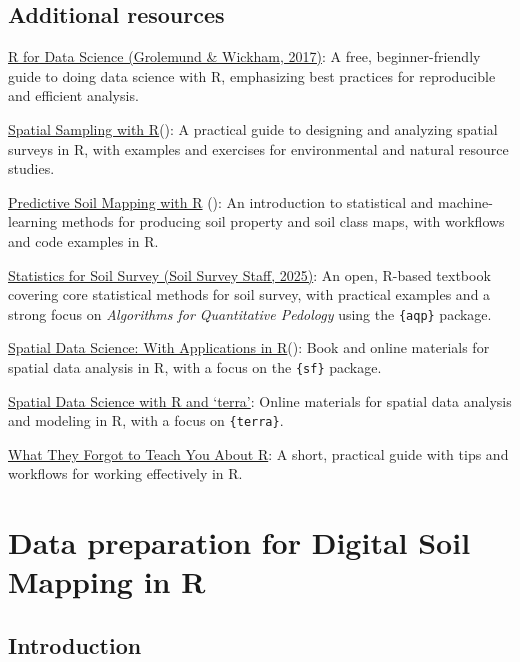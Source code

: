 \documentclass[
  10pt,
  b5paper,
  oneside]{book}
\begin{document}
\subsection{Additional resources}\label{r-resources}

\href{https://r4ds.had.co.nz/}{R for Data Science (Grolemund \& Wickham, 2017)}: A free, beginner-friendly guide to doing data science with R, emphasizing best practices for reproducible and efficient analysis.

\href{https://dickbrus.github.io/SpatialSamplingwithR/}{Spatial Sampling with R}(): A practical guide to designing and analyzing spatial surveys in R, with examples and exercises for environmental and natural resource studies.

\href{https://soilmapper.org/}{Predictive Soil Mapping with R} (): An introduction to statistical and machine-learning methods for producing soil property and soil class maps, with workflows and code examples in R.

\href{https://ncss-tech.github.io/stats_for_soil_example/}{Statistics for Soil Survey (Soil Survey Staff, 2025)}: An open, R-based textbook covering core statistical methods for soil survey, with practical examples and a strong focus on \emph{Algorithms for Quantitative Pedology} using the \texttt{\{aqp\}} package.

\href{https://rspatial.org/}{Spatial Data Science: With Applications in R}(): Book and online materials for spatial data analysis in R, with a focus on the \texttt{\{sf\}} package.

\href{https://rspatial.org/}{Spatial Data Science with R and `terra'}: Online materials for spatial data analysis and modeling in R, with a focus on \texttt{\{terra\}}.

\href{https://rstats.wtf/}{What They Forgot to Teach You About R}: A short, practical guide with tips and workflows for working effectively in R.

\section{Data preparation for Digital Soil Mapping in R}\label{data-preparation-for-digital-soil-mapping-in-r}

\subsection{Introduction}\label{introduction}
\end{document}

